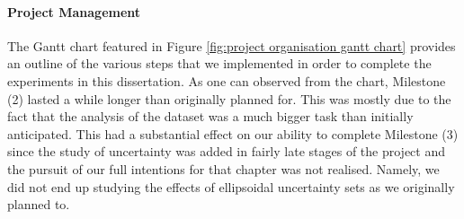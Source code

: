 \paragraph{Project Management}
The Gantt chart featured in Figure \ref{fig:project organisation gantt chart} provides an outline of the various steps that we implemented in order to complete the experiments in this dissertation. As one can observed from the chart, Milestone (2) lasted a while longer than originally planned for. This was mostly due to the fact that the analysis of the dataset was a much bigger task than initially anticipated. This had a substantial effect on our ability to complete Milestone (3) since the study of uncertainty was added in fairly late stages of the project and the pursuit of our full intentions for that chapter was not realised. Namely, we did not end up studying the effects of ellipsoidal uncertainty sets as we originally planned to.


